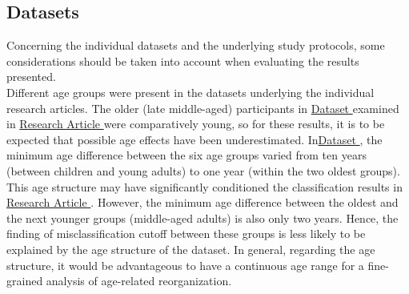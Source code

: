 \subsection{Datasets}
Concerning the individual datasets and the underlying study protocols, some considerations should be taken into account when evaluating the results presented.\\
Different age groups were present in the datasets underlying the individual research articles. The older (late middle-aged) participants in \hyperref[methods:datasets:I]{Dataset } examined in \hyperref[results:paperI]{Research Article } were comparatively young, so for these results, it is to be expected that possible age effects have been underestimated. In\hyperref[methods:datasets:II]{Dataset }, the minimum age difference between the six age groups varied from ten years (between children and young adults) to one year (within the two oldest groups). This age structure may have significantly conditioned the classification results in \hyperref[results:paperII]{Research Article }. However, the minimum age difference between the oldest and the next younger groups (middle-aged adults) is also only two years. Hence, the finding of misclassification cutoff between these groups is less likely to be explained by the age structure of the dataset. In general, regarding the age structure, it would be advantageous to have a continuous age range for a fine-grained analysis of age-related reorganization.\\
